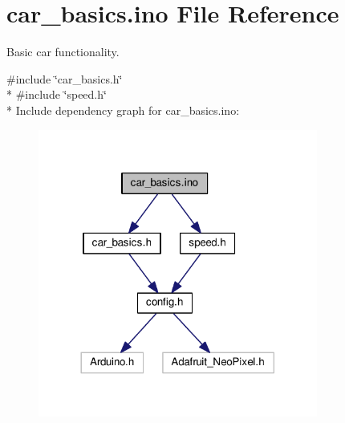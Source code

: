 \hypertarget{car__basics_8ino}{}\section{car\+\_\+basics.\+ino File Reference}
\label{car__basics_8ino}


Basic car functionality.  


{\ttfamily \#include \char`\"{}car\+\_\+basics.\+h\char`\"{}}\\*
{\ttfamily \#include \char`\"{}speed.\+h\char`\"{}}\\*
Include dependency graph for car\+\_\+basics.\+ino\+:\nopagebreak
\begin{figure}[H]
\begin{center}
\leavevmode
\includegraphics[width=260pt]{car__basics_8ino__incl}
\end{center}
\end{figure}
